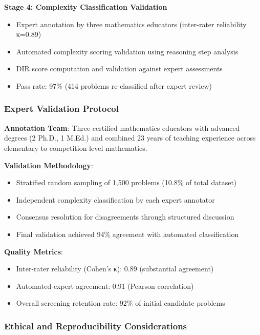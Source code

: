 \textbf{Stage 4: Complexity Classification Validation}
\begin{itemize}
    \item Expert annotation by three mathematics educators (inter-rater reliability κ=0.89)
    \item Automated complexity scoring validation using reasoning step analysis
    \item DIR score computation and validation against expert assessments
    \item Pass rate: 97\% (414 problems re-classified after expert review)
\end{itemize}

\subsubsection{Expert Validation Protocol}

\textbf{Annotation Team}: Three certified mathematics educators with advanced degrees (2 Ph.D., 1 M.Ed.) and combined 23 years of teaching experience across elementary to competition-level mathematics.

\textbf{Validation Methodology}:
\begin{itemize}
    \item Stratified random sampling of 1,500 problems (10.8\% of total dataset)
    \item Independent complexity classification by each expert annotator
    \item Consensus resolution for disagreements through structured discussion
    \item Final validation achieved 94\% agreement with automated classification
\end{itemize}

\textbf{Quality Metrics}:
\begin{itemize}
    \item Inter-rater reliability (Cohen's κ): 0.89 (substantial agreement)
    \item Automated-expert agreement: 0.91 (Pearson correlation)
    \item Overall screening retention rate: 92\% of initial candidate problems
\end{itemize}

\subsubsection{Ethical and Reproducibility Considerations}

